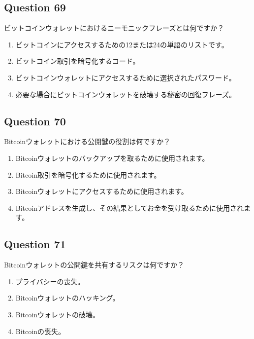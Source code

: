 \documentclass[12pt,a4paper]{article}
\begin{document}
\bigskip


\subsection*{Question 69}
ビットコインウォレットにおけるニーモニックフレーズとは何ですか？

\begin{enumerate}[label=\Alph*., leftmargin=*]
\item ビットコインにアクセスするための12または24の単語のリストです。
\item ビットコイン取引を暗号化するコード。
\item ビットコインウォレットにアクセスするために選択されたパスワード。
\item 必要な場合にビットコインウォレットを破壊する秘密の回復フレーズ。
\end{enumerate}

\bigskip


\subsection*{Question 70}
Bitcoinウォレットにおける公開鍵の役割は何ですか？

\begin{enumerate}[label=\Alph*., leftmargin=*]
\item Bitcoinウォレットのバックアップを取るために使用されます。
\item Bitcoin取引を暗号化するために使用されます。
\item Bitcoinウォレットにアクセスするために使用されます。
\item Bitcoinアドレスを生成し、その結果としてお金を受け取るために使用されます。
\end{enumerate}

\bigskip


\subsection*{Question 71}
Bitcoinウォレットの公開鍵を共有するリスクは何ですか？

\begin{enumerate}[label=\Alph*., leftmargin=*]
\item プライバシーの喪失。
\item Bitcoinウォレットのハッキング。
\item Bitcoinウォレットの破壊。
\item Bitcoinの喪失。
\end{enumerate}
\end{document}
